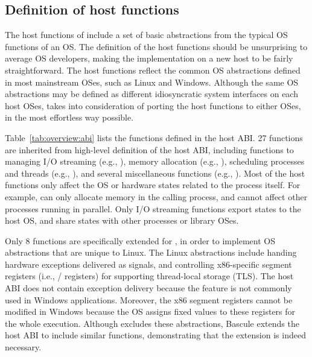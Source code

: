 \subsection{Definition of host functions}
\label{sec:overview:host:functions}


The host functions of \graphene{}
include a set of basic abstractions from the typical OS functions of an OS.
The definition of the host functions
should be unsurprising to average OS developers,
making the implementation on a new host to be fairly straightforward.
The host functions reflect the common OS abstractions defined in most mainstream OSes, such as Linux and Windows.
Although the same OS abstractions may be defined
as different idiosyncratic system interfaces on each host OSes,
\graphene{} takes into consideration of porting the host functions to either OSes, in the most effortless way possible.




Table~\ref{tab:overview:abi} lists the \palcalls{} functions defined in the \graphene{} host ABI.
27 functions are inherited
from high-level definition of the \drawbridge{} host ABI,
including functions to managing I/O streaming (e.g., ), memory allocation (e.g., ), scheduling processes and threads (e.g., ), and several miscellaneous functions (e.g., ).
Most of the host functions only affect the OS or hardware states
related to the process itself.
For example,  can only allocate memory in the calling process,
and cannot affect other processes running in parallel.
Only I/O streaming functions export states to the host OS, and share states with other processes or library OSes.



Only 8 functions are specifically extended for \graphene{}, in order to implement OS abstractions that are unique to Linux.
The Linux abstractions include
handing hardware exceptions delivered as signals,
and controlling 
x86-specific segment registers (i.e., / registers)
for supporting thread-local storage (TLS).
The \drawbridge{} host ABI does not contain exception delivery because the feature is
not commonly used in Windows applications.
Moreover, the x86 segment registers cannot be modified in Windows
because the OS assigns fixed values to these registers
for the whole execution.
Although \drawbridge{} excludes these abstractions, Bascule extends the host ABI to include similar functions,
demonstrating that the extension is indeed necessary.




